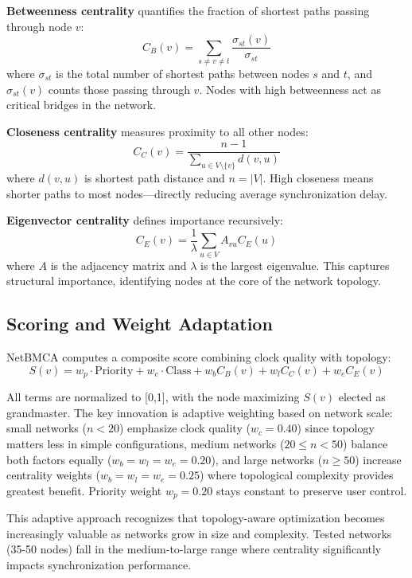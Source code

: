 \documentclass[conference]{IEEEtran}
\begin{document}
\textbf{Betweenness centrality} quantifies the fraction of shortest paths passing through node $v$:
\begin{equation}
C_B(v) = \sum_{s \neq v \neq t} \frac{\sigma_{st}(v)}{\sigma_{st}}
\end{equation}
where $\sigma_{st}$ is the total number of shortest paths between nodes $s$ and $t$, and $\sigma_{st}(v)$ counts those passing through $v$. Nodes with high betweenness act as critical bridges in the network.

\textbf{Closeness centrality} measures proximity to all other nodes:
\begin{equation}
C_C(v) = \frac{n-1}{\sum_{u \in V \setminus \{v\}} d(v,u)}
\end{equation}
where $d(v,u)$ is shortest path distance and $n = |V|$. High closeness means shorter paths to most nodes---directly reducing average synchronization delay.

\textbf{Eigenvector centrality} defines importance recursively:
\begin{equation}
C_E(v) = \frac{1}{\lambda} \sum_{u \in V} A_{vu} C_E(u)
\end{equation}
where $A$ is the adjacency matrix and $\lambda$ is the largest eigenvalue. This captures structural importance, identifying nodes at the core of the network topology.

\subsection{Scoring and Weight Adaptation}

NetBMCA computes a composite score combining clock quality with topology:
$$S(v) = w_p \cdot \text{Priority} + w_c \cdot \text{Class} + w_b C_B(v) + w_l C_C(v) + w_e C_E(v)$$

All terms are normalized to [0,1], with the node maximizing $S(v)$ elected as grandmaster. The key innovation is adaptive weighting based on network scale: small networks ($n<20$) emphasize clock quality ($w_c=0.40$) since topology matters less in simple configurations, medium networks ($20 \leq n < 50$) balance both factors equally ($w_b=w_l=w_e=0.20$), and large networks ($n \geq 50$) increase centrality weights ($w_b=w_l=w_e=0.25$) where topological complexity provides greatest benefit. Priority weight $w_p=0.20$ stays constant to preserve user control.

This adaptive approach recognizes that topology-aware optimization becomes increasingly valuable as networks grow in size and complexity. Tested networks (35-50 nodes) fall in the medium-to-large range where centrality significantly impacts synchronization performance.
\end{document}
